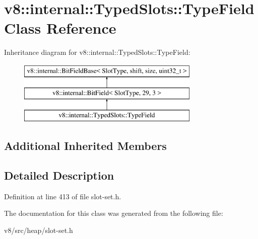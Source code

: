 \hypertarget{classv8_1_1internal_1_1TypedSlots_1_1TypeField}{}\section{v8\+:\+:internal\+:\+:Typed\+Slots\+:\+:Type\+Field Class Reference}
\label{classv8_1_1internal_1_1TypedSlots_1_1TypeField}
Inheritance diagram for v8\+:\+:internal\+:\+:Typed\+Slots\+:\+:Type\+Field\+:\begin{figure}[H]
\begin{center}
\leavevmode
\includegraphics[height=3.000000cm]{classv8_1_1internal_1_1TypedSlots_1_1TypeField}
\end{center}
\end{figure}
\subsection*{Additional Inherited Members}


\subsection{Detailed Description}


Definition at line 413 of file slot-\/set.\+h.



The documentation for this class was generated from the following file\+:\begin{DoxyCompactItemize}
\item 
v8/src/heap/slot-\/set.\+h\end{DoxyCompactItemize}
